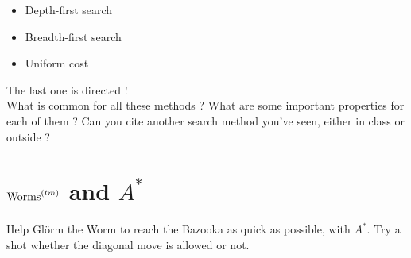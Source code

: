 \documentclass[11pt,a4paper,BCOR12mm, headexclude, footexclude, twoside, openright]{scrartcl}
\newcommand*{\TakeFourierOrnament}[1]{{%
\fontencoding{U}\fontfamily{futs}\selectfont\char#1}}
\newcommand*{\danger}{\TakeFourierOrnament{66}}
\numberwithin{equation}{section} %
\numberwithin{figure}{section} %
\numberwithin{table}{section} %
\begin{document}
\begin{itemize}
	\item Depth-first search
    \item Breadth-first search
    \item Uniform cost
\end{itemize}

\danger The last one is directed !\\

What is common for all these methods ? What are some important properties for each of them ? Can you cite another search method you've seen, either in class or outside ?

\section{$\textnormal{Worms}^{(tm)}$ and $A^*$}
Help Glörm the Worm to reach the Bazooka as quick as possible, with $A^*$. Try a shot whether the diagonal move is allowed or not.
\end{document}
